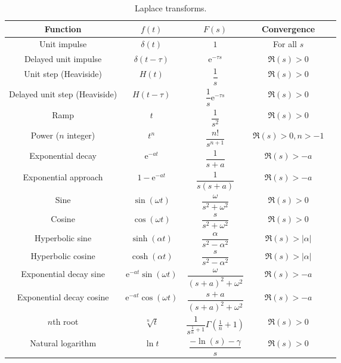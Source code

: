 \documentclass[fleqn]{article}
\newcommand{\me}{\mathrm{e}}
\begin{document}
\begin{table}[!p]
\centering
\caption{Laplace transforms.}
\label{tab:laplacetransforms}
\renewcommand{\arraystretch}{2}
\renewcommand{\tabcolsep}{0.4cm}
\begin{tabular}{ccScc}
\toprule
Function & $f(t)$ & $F(s)$ & Convergence\\
\midrule
Unit impulse & $\delta(t)$ & $1$ & For all $s$ \\
Delayed unit impulse & $\delta(t-\tau)$ & $\me^{-\tau s}$ & $\Re(s)>0$ \\
Unit step (Heaviside) & $H(t)$ & $\dfrac{1}{s}$ & $\Re(s)>0$ \\
Delayed unit step (Heaviside) & $H(t-\tau)$ & $\dfrac{1}{s}\me^{-\tau s}$ & $\Re(s)>0$ \\
Ramp & $t$ & $\dfrac{1}{s^2}$ & $\Re(s)>0$ \\
Power ($n$ integer) & $t^n$ & $\dfrac{n!}{s^{n+1}}$ & $\Re(s)>0, n>-1$ \\
Exponential decay & $\me^{-at}$ & $\dfrac{1}{s+a}$ & $\Re(s)>-a$ \\
Exponential approach & $1-\me^{-at}$ & $\dfrac{1}{s(s+a)}$ & $\Re(s)>-a$ \\
Sine & $\sin(\omega t)$ & $\dfrac{\omega}{s^2 + \omega^2}$ & $\Re(s)>0$ \\
Cosine & $\cos(\omega t)$ & $\dfrac{s}{s^2 + \omega^2}$ & $\Re(s)>0$ \\
Hyperbolic sine & $\sinh(\alpha t)$ & $\dfrac{\alpha}{s^2-\alpha^2}$ & $\Re(s)> |\alpha|$ \\
Hyperbolic cosine & $\cosh(\alpha t)$ & $\dfrac{s}{s^2-\alpha^2}$ & $\Re(s)> |\alpha|$ \\
Exponential decay sine & $\me^{-at}\sin(\omega t)$ & $\dfrac{\omega}{(s+a)^2 + \omega^2}$ & $\Re(s)>-a$ \\
Exponential decay cosine & $\me^{-at}\cos(\omega t)$ & $\dfrac{s+a}{(s+a)^2 + \omega^2}$ & $\Re(s)>-a$ \\
$n$th root & $\sqrt[n]{t}$ & $\dfrac{1}{s^{\frac{1}{n}+1}}\Gamma\left(\frac{1}{n}+1\right)$ & $\Re(s)>0$ \\
Natural logarithm & $\ln t$ & $\dfrac{-\ln (s) -\gamma}{s}$ & $\Re(s)>0$ \\
\bottomrule
\end{tabular}
\end{table}
\end{document}
